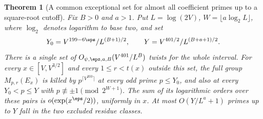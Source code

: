 \documentclass[a4paper,11pt]{article}
\newtheorem{theorem}[proposition]{Theorem}
\theoremstyle{definition}
\theoremstyle{remark}
\numberwithin{equation}{section}
\begin{document}
\begin{theorem}[A common exceptional set for almost all coefficient primes up to a square-root cutoff]
\label{thm:cutoff233}
Fix \(B>0\) and \(a>1\). Put \(L=\log(2V)\),
\(W=\lfloor a\log_2 L\rfloor\), where \(\log_2\) denotes logarithm
to base two, and set
\[
  Y_0=V^{199-6\eps}/L^{(B+1)/2},\qquad
  Y=V^{401/2}/L^{(B+a+1)/2}.
\]
There is a single set of \(O_{\psi,\eps,a,B}(V^{401}/L^B)\) twists
for the whole interval. For every \(x\in[V,V^{3/2}]\) and every
\(1\le r<t(x)\) outside this set, the full group \(M_{p,r}(E_x)\)
is killed by \(p^{\lceil V^{203}\rceil}\) at every odd prime
\(p\le Y_0\), and also at every \(Y_0<p\le Y\) with
\(p\not\equiv\pm1\pmod{2^{W+1}}\). The sum of its logarithmic
orders over these pairs is \(o(\exp(x^\eps/2))\), uniformly in \(x\).
At most \(O(Y/L^a+1)\) primes up to \(Y\) fall in the two excluded
residue classes.
\end{theorem}
\end{document}
